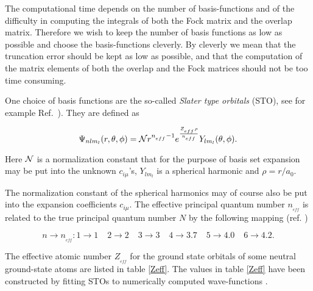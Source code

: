 The computational time depends on the number of
basis-functions and of the difficulty in computing the integrals of
both the Fock matrix and the overlap matrix. Therefore we wish to keep
the number of basis functions as low as possible and choose the
basis-functions cleverly. By cleverly we mean that the
truncation error should be kept as low as possible, and that the
computation of the matrix elements of both the overlap and the Fock
matrices should not be too time consuming.

One choice of basis functions are the so-called \emph{Slater type orbitals} (STO), see for example 
Ref.~\cite{atkins2003}). They are defined as

\begin{equation}
  \Psi_{nlm_l}(r,\theta,\phi) = {\cal N}r^{n_{_{eff}}-1}
  e^{\frac{Z_{_{eff}}\rho}{n_{_{eff}}}}Y_{lm_l}(\theta,\phi).
\label{STO}
\end{equation}

Here ${\cal N}$ is a normalization constant that for the purpose of
basis set expansion may be put into the unknown $c_{i\mu}$'s,
$Y_{lm_l}$ is a spherical harmonic
and $\rho=r/a_0$.

The normalization constant of the spherical harmonics may of course
also be put into the expansion coefficients $c_{i\mu}$. The effective
principal quantum number $n_{_{eff}}$ is related to the true principal
quantum number $N$ by the following mapping (ref. \cite{atkins2003})

\begin{equation*}
  n\to n_{_{eff}}:1\to1\phantom{aa} 2\to2\phantom{aa} 3\to3\phantom{aa}
  4\to3.7\phantom{aa} 5\to4.0\phantom{aa} 6\to4.2.
\end{equation*}

The effective atomic number $Z_{_{eff}}$ for the ground state orbitals
of some neutral ground-state atoms are listed in table \ref{Zeff}. The
values in table \ref{Zeff} have been constructed by fitting STOs to
numerically computed wave-functions \cite{clementi1963}.
\newline

